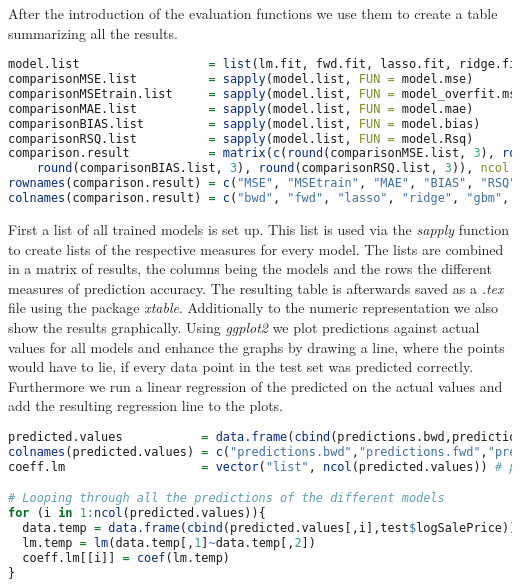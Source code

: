 After the introduction of the evaluation functions we use them to create a table summarizing all the results.
\begin{lstlisting}[language=R]
model.list                  = list(lm.fit, fwd.fit, lasso.fit, ridge.fit, gbmtuned, rftuned)
comparisonMSE.list          = sapply(model.list, FUN = model.mse)
comparisonMSEtrain.list     = sapply(model.list, FUN = model_overfit.mse)
comparisonMAE.list          = sapply(model.list, FUN = model.mae)
comparisonBIAS.list         = sapply(model.list, FUN = model.bias)
comparisonRSQ.list          = sapply(model.list, FUN = model.Rsq)
comparison.result           = matrix(c(round(comparisonMSE.list, 3), round(comparisonMSEtrain.list, 3), round(comparisonMAE.list, 3), 
    round(comparisonBIAS.list, 3), round(comparisonRSQ.list, 3)), ncol = length(model.list), byrow = TRUE)
rownames(comparison.result) = c("MSE", "MSEtrain", "MAE", "BIAS", "RSQ")
colnames(comparison.result) = c("bwd", "fwd", "lasso", "ridge", "gbm", "rf")
\end{lstlisting}
First a list of all trained models is set up. This list is used via the \textit{sapply} function to create lists of the respective measures for every model. The lists are combined in a matrix of results, the columns being the models and the rows the different measures of prediction accuracy. The resulting table is afterwards saved as a \textit{.tex} file using the package \textit{xtable}. Additionally to the numeric representation we also show the results graphically. Using \textit{ggplot2} we plot predictions against actual values  for all models and enhance the graphs by drawing a line, where the points would have to lie, if every data point in the test set was predicted correctly. Furthermore we run a linear regression of the predicted on the actual values and add the resulting regression line to the plots. 
\begin{lstlisting}[language=R]
predicted.values           = data.frame(cbind(predictions.bwd,predictions.fwd,predictions.lasso,predictions.ridge,predictions.rf,predictions.gbm))
colnames(predicted.values) = c("predictions.bwd","predictions.fwd","predictions.lasso","predictions.ridge","predictions.rf","predictions.gbm")
coeff.lm                   = vector("list", ncol(predicted.values)) # preparing an empty list for coefficients of regression

# Looping through all the predictions of the different models
for (i in 1:ncol(predicted.values)){
  data.temp = data.frame(cbind(predicted.values[,i],test$logSalePrice))
  lm.temp = lm(data.temp[,1]~data.temp[,2])
  coeff.lm[[i]] = coef(lm.temp)
}
\end{lstlisting}
